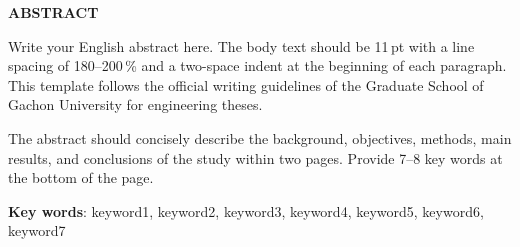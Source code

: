 \clearpage
\thispagestyle{plain}

\begin{center}
{\fontsize{16pt}{22pt}\selectfont\bfseries ABSTRACT\par}

\vspace{6mm}

{\fontsize{14pt}{20pt}\selectfont\bfseries \ThesisTitleEN\par}
\end{center}

\vspace{6mm}

\begin{flushright}
{\fontsize{12pt}{18pt}\selectfont
\AuthorEN\par
\DepartmentEN\par
\GraduateSchoolEN\par}
\end{flushright}

\vspace{8mm}


Write your English abstract here. The body text should be 11\,pt with a
line spacing of 180--200\,\% and a two-space indent at the beginning of
each paragraph. This template follows the official writing guidelines of
the Graduate School of Gachon University for engineering theses.

The abstract should concisely describe the background, objectives,
methods, main results, and conclusions of the study within two pages.
Provide 7--8 key words at the bottom of the page.

\vfill

\noindent\textbf{Key words}: keyword1, keyword2, keyword3, keyword4, keyword5, keyword6, keyword7
